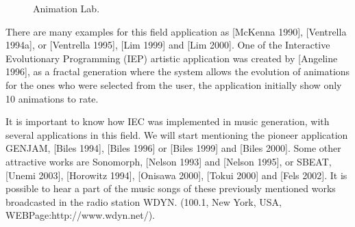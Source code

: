 \begin{figure}
\captionsetup{justification=centering,margin=2cm}
\centering
\setlength\fboxsep{0pt}
\setlength\fboxrule{0.7pt}
\caption{Animation Lab.}
\label{fig:AnimationLab}       
\end{figure}

There are many examples for this field application as
\cite{mckenna1990dynamic}[McKenna 1990],
\cite{ventrella1994explorations}[Ventrella 1994a], or
\cite{ventrella1995disney}[Ventrella 1995], \cite{lim1999pro}[Lim 1999] and
\cite{lim2000solve}[Lim 2000].  One of the Interactive Evolutionary Programming
(IEP)  artistic application was created by \cite{angeline1996evolving}[Angeline
1996], as a fractal generation where the system allows the evolution of
animations for the ones who were selected from the user, the application
initially show only 10 animations to rate.


It is important to know how IEC was implemented in music generation, with
several applications in this field. We will start mentioning the pioneer
application GENJAM, \cite{biles1994genjam}[Biles 1994],
\cite{biles1996neural}[Biles 1996] or \cite{biles1999life}[Biles 1999] and
\cite{biles2002genjam}[Biles 2000]. Some other attractive works are Sonomorph,
\cite{nelson1993sonomorphs}[Nelson 1993] and \cite{nelson1995further}[Nelson
1995], or SBEAT, \cite{unemi2003sbeat3}[Unemi 2003],
\cite{horowitz1994generating}[Horowitz 1994], \cite{onisawa2000composition}[Onisawa
2000], \cite{tokui2000music}[Tokui 2000] and
\cite{fels2002interactive}[Fels 2002]. It is possible to hear a part of the
music songs of these previously mentioned works broadcasted in the radio station
WDYN. (100.1, New York, USA, WEBPage:http://www.wdyn.net/).

